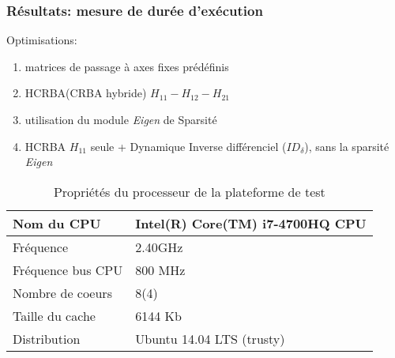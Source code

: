 \documentclass[10pt]{beamer}
\begin{document}
\begin{frame}\scriptsize
  \frametitle{Résultats: mesure de durée d'exécution}

  Optimisations:
	\begin{enumerate}
	\item matrices de passage à axes fixes prédéfinis
	\item HCRBA(CRBA hybride) $H_{11}-H_{12}-H_{21}$
	\item utilisation du module \emph{Eigen} de Sparsité
	\item HCRBA $H_{11}$ seule + Dynamique Inverse différenciel ($ID_\delta$), sans la sparsité \emph{Eigen}
	\end{enumerate}
	
	
	\begin{flushleft}
	
	\begin{table}[H]
	\begin{center}
	\begin{tabular}[H]{|l|l|}
	\hline
	Nom du CPU & Intel(R) Core(TM) i7-4700HQ CPU \\ \hline \hline
	Fréquence & 2.40GHz \\ \hline
	Fréquence bus CPU & 800 MHz \\ \hline
	Nombre de coeurs & 8(4) \\ \hline
	Taille du cache & 6144 Kb \\ \hline
	Distribution & Ubuntu 14.04 LTS (trusty) \\
	\hline
	\end{tabular}
	\caption[Table caption text]{Propriétés du processeur de la plateforme de test}
	\label{table:propriétésProc}
	\end{center}
	\end{table}
	
	\end{flushleft}
	
\end{frame}
\end{document}
